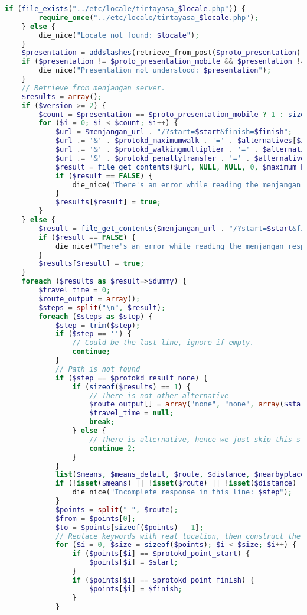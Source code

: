 \begin{lstlisting}[language=PHP,basicstyle=\tiny,caption=handle.php,label={lst:handle.php}]
	if (file_exists("../etc/locale/tirtayasa_$locale.php")) {
		require_once("../etc/locale/tirtayasa_$locale.php");
	} else {
		die_nice("Locale not found: $locale");
	}
	$presentation = addslashes(retrieve_from_post($proto_presentation));
	if ($presentation != $proto_presentation_mobile && $presentation != $proto_presentation_desktop) {
		die_nice("Presentation not understood: $presentation");
	}
	// Retrieve from menjangan server.
	$results = array();
	if ($version >= 2) {
		$count = $presentation == $proto_presentation_mobile ? 1 : sizeof($alternatives);
		for ($i = 0; $i < $count; $i++) {
			$url = $menjangan_url . "/?start=$start&finish=$finish";
			$url .= '&' . $protokd_maximumwalk . '=' . $alternatives[$i][$protokd_maximumwalk];
			$url .= '&' . $protokd_walkingmultiplier . '=' . $alternatives[$i][$protokd_walkingmultiplier];
			$url .= '&' . $protokd_penaltytransfer . '=' . $alternatives[$i][$protokd_penaltytransfer];
			$result = file_get_contents($url, NULL, NULL, 0, $maximum_http_response_size + 1);
			if ($result == FALSE) {
				die_nice("There's an error while reading the menjangan response.");
			}
			$results[$result] = true;
		}		
	} else {
		$result = file_get_contents($menjangan_url . "/?start=$start&finish=$finish", NULL, NULL, 0, $maximum_http_response_size + 1);
		if ($result == FALSE) {
			die_nice("There's an error while reading the menjangan response.");
		}
		$results[$result] = true;
	}
	foreach ($results as $result=>$dummy) {
		$travel_time = 0;
		$route_output = array();
		$steps = split("\n", $result);
		foreach ($steps as $step) {
			$step = trim($step);
			if ($step == '') {
				// Could be the last line, ignore if empty.
				continue;
			}
			// Path is not found
			if ($step == $protokd_result_none) {
				if (sizeof($results) == 1) {
					// There is not other alternative
					$route_output[] = array("none", "none", array($start, $finish), $message_routenotfound[$presentation], null, null);
					$travel_time = null;
					break;
				} else {
					// There is alternative, hence we just skip this step.
					continue 2;
				}
			}
			list($means, $means_detail, $route, $distance, $nearbyplaceids) = split("/", $step);
			if (!isset($means) || !isset($route) || !isset($distance) || !isset($nearbyplaceids)) {
				die_nice("Incomplete response in this line: $step");
			}
			$points = split(" ", $route);
			$from = $points[0];
			$to = $points[sizeof($points) - 1];
			// Replace keywords with real location, then construct the detailed path
			for ($i = 0, $size = sizeof($points); $i < $size; $i++) {
				if ($points[$i] == $protokd_point_start) {
					$points[$i] = $start;
				}
				if ($points[$i] == $protokd_point_finish) {
					$points[$i] = $finish;
				}
			}
	

\end{lstlisting}

